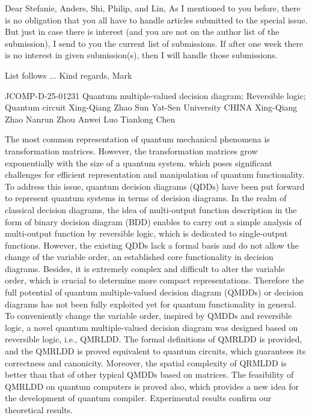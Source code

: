 Dear Stefanie, Anders, Shi, Philip, and Lin,
As I mentioned to you before, there is no obligation that you all have to handle articles submitted to the special issue.   But just in case there is interest (and you are not on the author list of the submission), I send to you the current list of submissions.  If after one week there is no interest in given submission(s), then I will handle those  submissions.

List follows ...
Kind regards,
Mark



JCOMP-D-25-01231
Quantum multiple-valued decision diagram; Reversible logic; Quantum circuit
Xing-Qiang Zhao
Sun Yat-Sen University
CHINA
Xing-Qiang Zhao
Nanrun Zhou
Anwei Luo
Tianlong Chen

The most common representation of quantum mechanical phenomena is
transformation matrices. However, the transformation matrices grow exponentially with
the size of a quantum system. which poses significant challenges for efficient
representation and manipulation of quantum functionality. To address this issue,
quantum decision diagrams (QDDs) have been put forward to represent quantum
systems in terms of decision diagrams. In the realm of classical decision diagrams, the
idea of multi-output function description in the form of binary decision diagram (BDD)
enables to carry out a simple analysis of multi-output function by reversible logic, which
is dedicated to single-output functions. However, the existing QDDs lack a formal basis
and do not allow the change of the variable order, an established core functionality in
decision diagrams. Besides, it is extremely complex and difficult to alter the variable
order, which is crucial to determine more compact representations. Therefore the full
potential of quantum multiple-valued decision diagram (QMDDs) or decision diagrams
has not been fully exploited yet for quantum functionality in general. To conveniently
change the variable order, inspired by QMDDs and reversible logic, a novel quantum
multiple-valued decision diagram was designed based on reversible logic, i.e.,
QMRLDD. The formal definitions of QMRLDD is provided, and the QMRLDD is proved
equivalent to quantum circuits, which guarantees its correctness and canonicity.
Moreover, the spatial complexity of QRMLDD is better than that of other typical
QMDDs based on matrices. The feasibility of QMRLDD on quantum computers is
proved also, which provides a new idea for the development of quantum compiler.
Experimental results confirm our theoretical results.

